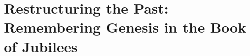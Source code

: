 
\chapter{Restructuring the Past: Remembering Genesis in the Book of Jubilees}
\label{chap:jubilees}




